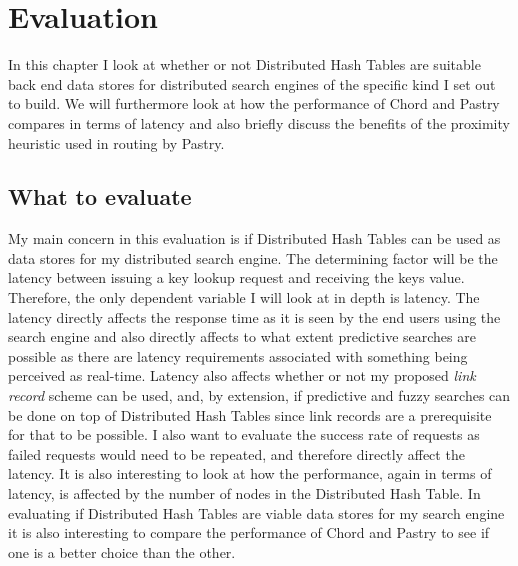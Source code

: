 

%
%
%
% 
%

\chapter{Evaluation}
In this chapter I look at whether or not Distributed Hash Tables are suitable back end data stores for distributed search engines of the specific kind I set out to build. We will furthermore look at how the performance of Chord and Pastry compares in terms of latency and also briefly discuss the benefits of the proximity heuristic used in routing by Pastry. 

\section{What to evaluate}
My main concern in this evaluation is if Distributed Hash Tables can be used as data stores for my distributed search engine. The determining factor will be the latency between issuing a key lookup request and receiving the keys value. Therefore, the only dependent variable I will look at in depth is latency.
The latency directly affects the response time as it is seen by the end users using the search engine and also directly affects to what extent predictive searches are possible as there are latency requirements associated with something being perceived as real-time.
Latency also affects whether or not my proposed \emph{link record} scheme can be used, and, by extension, if predictive and fuzzy searches can be done on top of Distributed Hash Tables since link records are a prerequisite for that to be possible.
I also want to evaluate the success rate of requests as failed requests would need to be repeated, and therefore directly affect the latency.
It is also interesting to look at how the performance, again in terms of latency, is affected by the number of nodes in the Distributed Hash Table.
In evaluating if Distributed Hash Tables are viable data stores for my search engine it is also interesting to compare the performance of Chord and Pastry to see if one is a better choice than the other.

